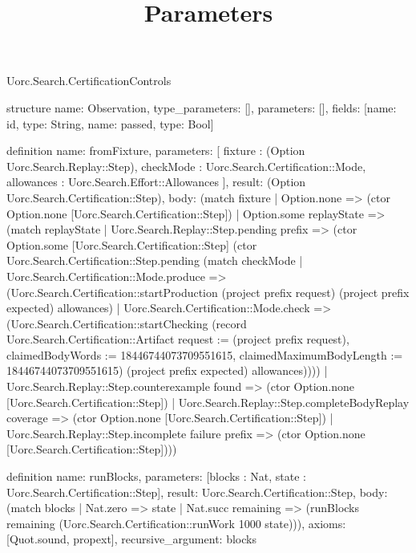 \begin{lexlean}{Uorc.Search.CertificationControls}
\title{Parameters}
\begin{semanticmodule}
structure{
  name: Observation,
  type_parameters: [],
  parameters: [],
  fields: [{name: id, type: String}, {name: passed, type: Bool}]
}

definition{
  name: fromFixture,
  parameters: [
    fixture : (Option Uorc.Search.Replay::Step),
    checkMode : Uorc.Search.Certification::Mode,
    allowances : Uorc.Search.Effort::Allowances
  ],
  result: (Option Uorc.Search.Certification::Step),
  body: (match fixture
    | Option.none => (ctor Option.none [Uorc.Search.Certification::Step])
    | Option.some replayState => (match replayState
      | Uorc.Search.Replay::Step.pending prefix => (ctor Option.some [Uorc.Search.Certification::Step] (ctor Uorc.Search.Certification::Step.pending (match checkMode
        | Uorc.Search.Certification::Mode.produce => (Uorc.Search.Certification::startProduction (project prefix request) (project prefix expected) allowances)
        | Uorc.Search.Certification::Mode.check => (Uorc.Search.Certification::startChecking (record Uorc.Search.Certification::Artifact {request := (project prefix request), claimedBodyWords := 18446744073709551615, claimedMaximumBodyLength := 18446744073709551615}) (project prefix expected) allowances))))
      | Uorc.Search.Replay::Step.counterexample found => (ctor Option.none [Uorc.Search.Certification::Step])
      | Uorc.Search.Replay::Step.completeBodyReplay coverage => (ctor Option.none [Uorc.Search.Certification::Step])
      | Uorc.Search.Replay::Step.incomplete failure prefix => (ctor Option.none [Uorc.Search.Certification::Step])))
}

definition{
  name: runBlocks,
  parameters: [blocks : Nat, state : Uorc.Search.Certification::Step],
  result: Uorc.Search.Certification::Step,
  body: (match blocks
    | Nat.zero => state
    | Nat.succ remaining => (runBlocks remaining (Uorc.Search.Certification::runWork 1000 state))),
  axioms: [Quot.sound, propext],
  recursive_argument: blocks
}


\end{semanticmodule}
\end{lexlean}
